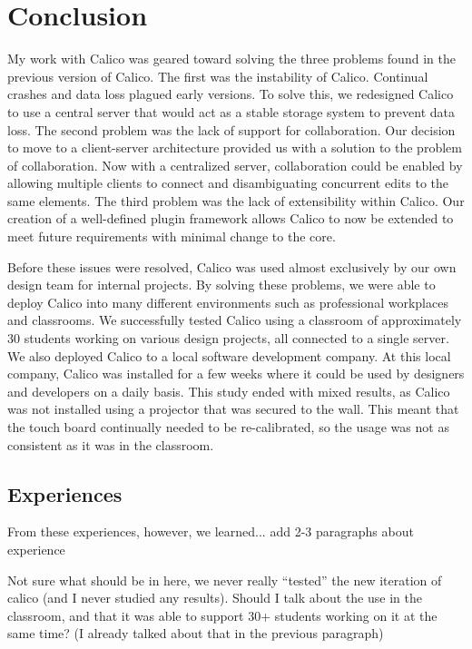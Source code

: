 \chapter{Conclusion}
My work with Calico was geared toward solving the three problems found in the previous version of Calico. The first was the instability of Calico. Continual crashes and data loss plagued early versions. To solve this, we redesigned Calico to use a central server that would act as a stable storage system to prevent data loss. The second problem was the lack of support for collaboration. Our decision to move to a client-server architecture provided us with a solution to the problem of collaboration. Now with a centralized server, collaboration could be enabled by allowing multiple clients to connect and disambiguating concurrent edits to the same elements. The third problem was the lack of extensibility within Calico. Our creation of a well-defined plugin framework allows Calico to now be extended to meet future requirements with minimal change to the core.

Before these issues were resolved, Calico was used almost exclusively by our own design team for internal projects. By solving these problems, we were able to deploy Calico into many different environments such as professional workplaces and classrooms. We successfully tested Calico using a classroom of approximately 30 students working on various design projects, all connected to a single server. We also deployed Calico to a local software development company. At this local company, Calico was installed for a few weeks where it could be used by designers and developers on a daily basis. This study ended with mixed results, as Calico was not installed using a projector that was secured to the wall. This meant that the touch board continually needed to be re-calibrated, so the usage was not as consistent as it was in the classroom.

\section*{Experiences}
From these experiences, however, we learned...
add 2-3 paragraphs about experience

Not sure what should be in here, we never really ``tested'' the new iteration of calico (and I never studied any results). Should I talk about the use in the classroom, and that it was able to support 30+ students working on it at the same time? (I already talked about that in the previous paragraph)

